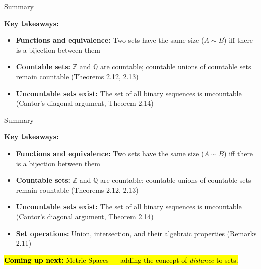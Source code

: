 \documentclass[aspectratio=169,12pt,t]{beamer}
\begin{document}
{%
\begin{frame}{Summary}
  \begin{hlbox}
    \textbf{Key takeaways:}
    \begin{itemize}
      \item \textbf{Functions and equivalence:} Two sets have the same size
        ($A \sim B$) iff there is a bijection between them
      \item \textbf{Countable sets:} $\mathbb{Z}$ and $\mathbb{Q}$ are countable;
        countable unions of countable sets remain countable (Theorems 2.12, 2.13)
      \item \textbf{Uncountable sets exist:} The set of all binary sequences is
        uncountable (Cantor's diagonal argument, Theorem 2.14)
    \end{itemize}
  \end{hlbox}

\end{frame}

\begin{frame}{Summary}
  \begin{hlbox}
    \textbf{Key takeaways:}
    \begin{itemize}
      \item \textbf{Functions and equivalence:} Two sets have the same size
        ($A \sim B$) iff there is a bijection between them
      \item \textbf{Countable sets:} $\mathbb{Z}$ and $\mathbb{Q}$ are countable;
        countable unions of countable sets remain countable (Theorems 2.12, 2.13)
      \item \textbf{Uncountable sets exist:} The set of all binary sequences is
        uncountable (Cantor's diagonal argument, Theorem 2.14)
      \item \textbf{Set operations:} Union, intersection, and their algebraic properties
        (Remarks 2.11)
    \end{itemize}
  \end{hlbox}

  \vspace{0.5em}
  \begin{center}
    \hl{\textbf{Coming up next:} Metric Spaces --- adding the concept of \emph{distance} to sets.}
  \end{center}

\end{frame}
}
\end{document}
